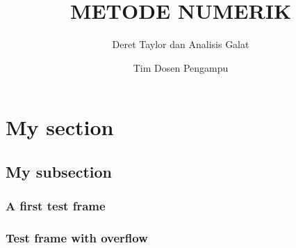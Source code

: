 \documentclass[pdflatex,compress]{beamer}
\title{METODE NUMERIK}
\subtitle{Deret Taylor dan Analisis Galat}
\author{Tim Dosen Pengampu}
\begin{document}
\maketitle

\section{My section}
\subsection{My subsection}

\begin{frame}
\frametitle{A first test frame}
\lipsum[1]
\end{frame}

\begin{frame}
\frametitle{Test frame with overflow}
\lipsum%
\end{frame}


\end{document}
